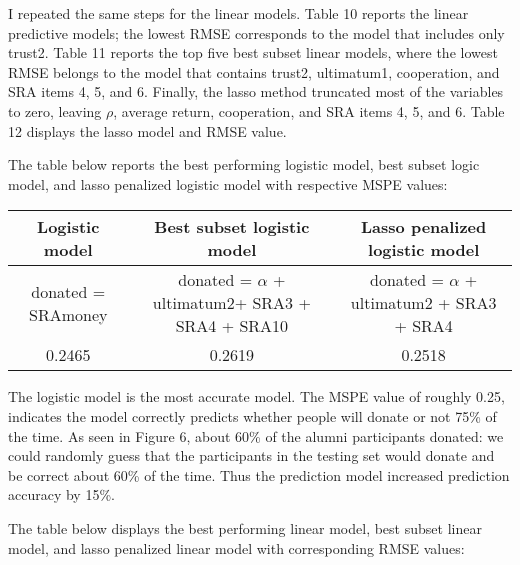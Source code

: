 \documentclass[12pt]{article}
\begin{document}
I repeated the same steps for the linear models. Table 10 reports the linear predictive models; the lowest RMSE corresponds to the model that includes only trust2. Table 11 reports the top five best subset linear models, where the lowest RMSE belongs to the model that contains trust2, ultimatum1, cooperation, and SRA items 4, 5, and 6. Finally, the lasso method truncated most of the variables to zero, leaving \(\rho\), average return, cooperation, and SRA items 4, 5, and 6. Table 12 displays the lasso model and RMSE value.


The table below reports the best performing logistic model, best subset logic model, and lasso penalized logistic model with respective MSPE values:

\vspace{5mm} \begin{adjustbox}{width=\textwidth}
\begin{tabular}{ c | c | c }
\hline \hline
Logistic model & Best subset logistic model & Lasso penalized logistic model \\ 
\hline
\small donated = SRAmoney & donated = \(\alpha\) + ultimatum2+ SRA3 + SRA4 + SRA10 & donated = \(\alpha\) + ultimatum2 + SRA3 + SRA4 \\
 \hline
 0.2465 & 0.2619 & 0.2518 \\  
 \hline \hline
\end{tabular}
\end{adjustbox}

\vspace{5mm} The logistic model is the most accurate model. The MSPE value of roughly 0.25, indicates the model correctly predicts whether people will donate or not 75\% of the time. As seen in Figure 6, about 60\% of the alumni participants donated: we could randomly guess that the participants in the testing set would donate and be correct about 60\% of the time. Thus the prediction model increased prediction accuracy by 15\%.
 
The table below displays the best performing linear model, best subset linear model, and lasso penalized linear model with corresponding RMSE values:
 
\end{document}
